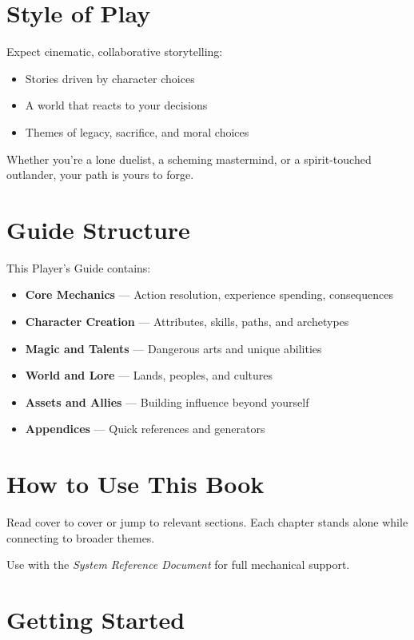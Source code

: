 \section*{Style of Play} 

Expect cinematic, collaborative storytelling: \begin{itemize} \item Stories driven by character choices \item A world that reacts to your decisions \item Themes of legacy, sacrifice, and moral choices \end{itemize}

Whether you're a lone duelist, a scheming mastermind, or a spirit-touched outlander, your path is yours to forge.

\section*{Guide Structure}

This Player's Guide contains:

\begin{itemize} 
  \item \textbf{Core Mechanics} — Action resolution, experience spending, consequences 
  \item \textbf{Character Creation} — Attributes, skills, paths, and archetypes 
  \item \textbf{Magic and Talents} — Dangerous arts and unique abilities 
  \item \textbf{World and Lore} — Lands, peoples, and cultures 
  \item \textbf{Assets and Allies} — Building influence beyond yourself 
  \item \textbf{Appendices} — Quick references and generators 
\end{itemize}

\section*{How to Use This Book}

Read cover to cover or jump to relevant sections. Each chapter stands alone while connecting to broader themes.

Use with the \emph{System Reference Document} for full mechanical support.

\section*{Getting Started}

